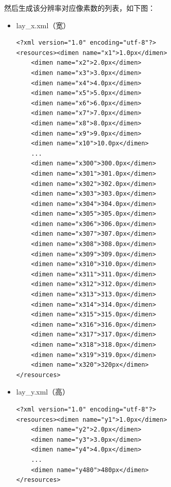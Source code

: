 \documentclass[9pt, b5paper]{article}
\begin{document}
\begin{enumerate}
\begin{enumerate}
\begin{enumerate}
然后生成该分辨率对应像素数的列表，如下图：
\begin{itemize}
\item lay\_x.xml（宽）
\begin{verbatim}
<?xml version="1.0" encoding="utf-8"?>
<resources><dimen name="x1">1.0px</dimen>
    <dimen name="x2">2.0px</dimen>
    <dimen name="x3">3.0px</dimen>
    <dimen name="x4">4.0px</dimen>
    <dimen name="x5">5.0px</dimen>
    <dimen name="x6">6.0px</dimen>
    <dimen name="x7">7.0px</dimen>
    <dimen name="x8">8.0px</dimen>
    <dimen name="x9">9.0px</dimen>
    <dimen name="x10">10.0px</dimen>
    ...
    <dimen name="x300">300.0px</dimen>
    <dimen name="x301">301.0px</dimen>
    <dimen name="x302">302.0px</dimen>
    <dimen name="x303">303.0px</dimen>
    <dimen name="x304">304.0px</dimen>
    <dimen name="x305">305.0px</dimen>
    <dimen name="x306">306.0px</dimen>
    <dimen name="x307">307.0px</dimen>
    <dimen name="x308">308.0px</dimen>
    <dimen name="x309">309.0px</dimen>
    <dimen name="x310">310.0px</dimen>
    <dimen name="x311">311.0px</dimen>
    <dimen name="x312">312.0px</dimen>
    <dimen name="x313">313.0px</dimen>
    <dimen name="x314">314.0px</dimen>
    <dimen name="x315">315.0px</dimen>
    <dimen name="x316">316.0px</dimen>
    <dimen name="x317">317.0px</dimen>
    <dimen name="x318">318.0px</dimen>
    <dimen name="x319">319.0px</dimen>
    <dimen name="x320">320px</dimen>
</resources>
\end{verbatim}
\item lay\_y.xml（高）
\begin{verbatim}
<?xml version="1.0" encoding="utf-8"?>
<resources><dimen name="y1">1.0px</dimen>
    <dimen name="y2">2.0px</dimen>
    <dimen name="y3">3.0px</dimen>
    <dimen name="y4">4.0px</dimen>
    ...
    <dimen name="y480">480px</dimen>
</resources>
\end{verbatim}
\end{itemize}


\end{enumerate}
\end{enumerate}
\end{enumerate}
\end{document}
